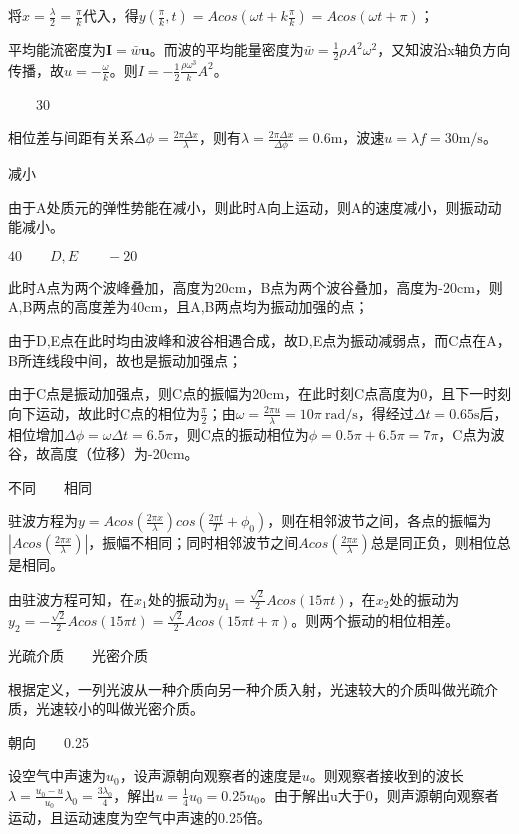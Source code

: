 将$x=\frac{\lambda}{2}=\frac{\pi}{k}$代入，得$y(\frac{\pi}{k},t)=Acos(\omega t+k\frac{\pi}{k})=Acos(\omega t+\pi)$；

平均能流密度为$\textbf{I}=\bar{w}\textbf{u}$。而波的平均能量密度为$\bar{w}=\frac{1}{2}\rho A^2 \omega^2$，又知波沿x轴负方向传播，故$u=-\frac{\omega}{k}$。则$I=-\frac{1}{2}\frac{\rho \omega^3}{k}A^2$。

$\qquad$30

\solve 相位差与间距有关系$\Delta \phi=\frac{2\pi \Delta x}{\lambda}$，则有$\lambda=\frac{2\pi \Delta x}{\Delta \phi}=0.6\mathrm{m}$，波速$u=\lambda f=30\mathrm{m/s}$。

\exercise 减小

\solve 由于A处质元的弹性势能在减小，则此时A向上运动，则A的速度减小，则振动动能减小。

\exercise $40\qquad D,E \qquad -20$

\solve 此时A点为两个波峰叠加，高度为20cm，B点为两个波谷叠加，高度为-20cm，则A,B两点的高度差为40cm，且A,B两点均为振动加强的点；

由于D,E点在此时均由波峰和波谷相遇合成，故D,E点为振动减弱点，而C点在A，B所连线段中间，故也是振动加强点；

由于C点是振动加强点，则C点的振幅为20cm，在此时刻C点高度为0，且下一时刻向下运动，故此时C点的相位为$\frac{\pi}{2}$；由$\omega=\frac{2\pi u}{\lambda}=10\pi\ \mathrm{rad/s}$，得经过$\Delta t=0.65\mathrm{s}$后，相位增加$\Delta \phi=\omega\Delta t=6.5\pi$，则C点的振动相位为$\phi=0.5\pi+6.5\pi=7\pi$，C点为波谷，故高度（位移）为-20cm。

\exercise 不同$\qquad$相同

\solve 驻波方程为$y=Acos(\frac{2\pi x}{\lambda})cos(\frac{2\pi t}{T}+\phi_0)$，则在相邻波节之间，各点的振幅为$|Acos(\frac{2\pi x}{\lambda})|$，振幅不相同；同时相邻波节之间$Acos(\frac{2\pi x}{\lambda})$总是同正负，则相位总是相同。

\exercise \pi

\solve 由驻波方程可知，在$x_1$处的振动为$y_1=\frac{\sqrt{2}}{2}Acos(15\pi t)$，在$x_2$处的振动为$y_2=-\frac{\sqrt{2}}{2}Acos(15\pi t)=\frac{\sqrt{2}}{2}Acos(15\pi t+\pi)$。则两个振动的相位相差\pi。

\exercise 光疏介质$\qquad$光密介质

\solve 根据定义，一列光波从一种介质向另一种介质入射，光速较大的介质叫做光疏介质，光速较小的叫做光密介质。

\exercise 朝向$\qquad$0.25

\solve 设空气中声速为$u_0$，设声源朝向观察者的速度是$u$。则观察者接收到的波长$\lambda=\frac{u_0-u}{u_0}\lambda_0=\frac{3\lambda_0}{4}$，解出$u=\frac{1}{4}u_0=0.25u_0$。由于解出u大于0，则声源朝向观察者运动，且运动速度为空气中声速的0.25倍。

